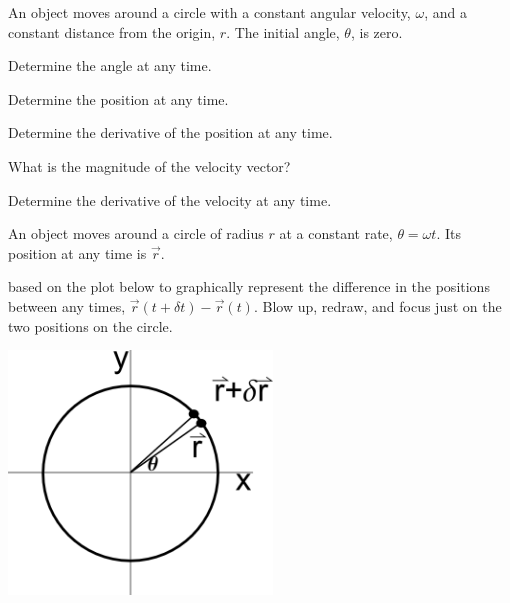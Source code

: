 
\begin{problem}
\item An object moves around a circle with a constant angular
  velocity, $\omega$, and a constant distance from the origin,
  $r$. The initial angle, $\theta$, is zero.
  \begin{subproblem}
  \item Determine the angle at any time.
    \vfill
  \item Determine the position at any time.
    \vfill
  \item Determine the derivative of the position at any time.
    \vfill
  \item What is the magnitude of the velocity vector?
    \vfill
  \item Determine the derivative of the velocity at any time.
    \vfill
  \end{subproblem}

  \clearpage

\item An object moves around a circle of radius $r$  at a constant
  rate, $\theta=\omega t$. Its position at any time is $\vec{r}$.

  \begin{subproblem}
  \item based on the plot below to graphically represent the
    difference in the positions between any times, $\vec{r}(t+\delta
    t)-\vec{r}(t)$. Blow up, redraw, and focus just on the two
    positions on the circle.

    \includegraphics[width=7cm]{ink/week12/circularAcceleration}


\end{subproblem}
\end{problem}

